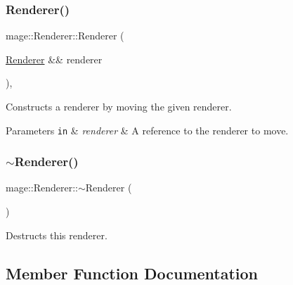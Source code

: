 \subsubsection{\texorpdfstring{Renderer()}{Renderer()}\hspace{0.1cm}{\footnotesize\ttfamily [3/3]}}
{\footnotesize\ttfamily mage\+::\+Renderer\+::\+Renderer (\begin{DoxyParamCaption}\item[{\hyperlink{classmage_1_1_renderer}{Renderer} \&\&}]{renderer }\end{DoxyParamCaption})\hspace{0.3cm}{\ttfamily [default]}, {\ttfamily [noexcept]}}

Constructs a renderer by moving the given renderer.


\begin{DoxyParams}[1]{Parameters}
\mbox{\tt in}  & {\em renderer} & A reference to the renderer to move. \\
\hline
\end{DoxyParams}
\hypertarget{classmage_1_1_renderer_a997e041f28cc71d069d1ab7d29fe6ced}{}\label{classmage_1_1_renderer_a997e041f28cc71d069d1ab7d29fe6ced} 
\subsubsection{\texorpdfstring{$\sim$\+Renderer()}{~Renderer()}}
{\footnotesize\ttfamily mage\+::\+Renderer\+::$\sim$\+Renderer (\begin{DoxyParamCaption}{ }\end{DoxyParamCaption})\hspace{0.3cm}{\ttfamily [default]}}

Destructs this renderer. 

\subsection{Member Function Documentation}
\hypertarget{classmage_1_1_renderer_a7e303935e21196e28305cf4676128703}{}\label{classmage_1_1_renderer_a7e303935e21196e28305cf4676128703} 
